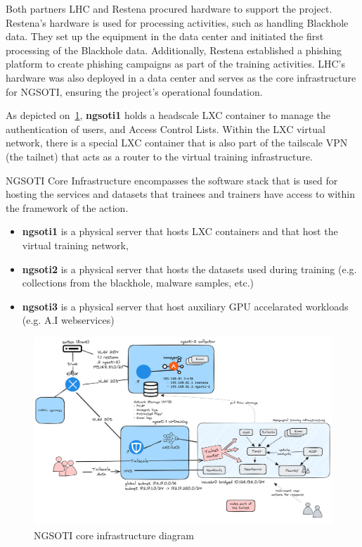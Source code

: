 Both partners LHC and Restena procured hardware to support the project. Restena's
hardware is used for processing activities, such as handling Blackhole data.
They set up the equipment in the data center and initiated the first
processing of the Blackhole data. Additionally, Restena established a
phishing platform to create phishing campaigns as part of the training
activities. LHC's hardware was also deployed in a data center and serves as
the core infrastructure for NGSOTI, ensuring the project's operational foundation.

As depicted on~\ref{fig1}, {\bf{ngsoti1}} holds a headscale LXC container to
manage the authentication of users, and Access Control Lists. Within the LXC
virtual network, there is a special LXC container that is also part of the
tailscale VPN (the tailnet) that acts as a router to the virtual training
infrastructure.

NGSOTI Core Infrastructure encompasses the software stack that is used for
hosting the services and datasets that trainees and trainers have access to
within the framework of the action.

\begin{itemize}
	\item {\bf{ngsoti1}} is a physical server that hosts LXC containers and that host the virtual training network,
	\item {\bf{ngsoti2}} is a physical server that hosts the datasets used during training (e.g. collections from the blackhole, malware samples, etc.)
	\item {\bf{ngsoti3}} is a physical server that host auxiliary GPU accelarated workloads (e.g. A.I webservices)
\end{itemize}



\begin{figure}[ht]
	\centering
	\includegraphics[width=\textwidth]{./img/NGSOTI-architecture.png}
	\caption{NGSOTI core infrastructure diagram}
	\label{fig1}
	\end{figure}

